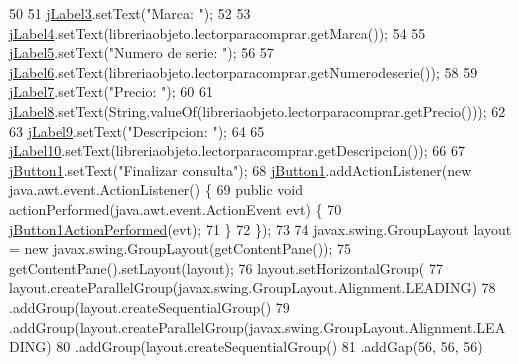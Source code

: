 \begin{DoxyCode}
50 
51         \mbox{\hyperlink{class_interfaz_package_1_1_consulta_lector_a105b198c795b5ad60698132d959db7c1}{jLabel3}}.setText(\textcolor{stringliteral}{"Marca: "});
52 
53         \mbox{\hyperlink{class_interfaz_package_1_1_consulta_lector_a17804aaae39ab2791472fa0422b576ff}{jLabel4}}.setText(libreriaobjeto.lectorparacomprar.getMarca());
54 
55         \mbox{\hyperlink{class_interfaz_package_1_1_consulta_lector_aae29076b214d7968c66c12c3cb9dcab2}{jLabel5}}.setText(\textcolor{stringliteral}{"Numero de serie: "});
56 
57         \mbox{\hyperlink{class_interfaz_package_1_1_consulta_lector_a1ae0bbc522d743dbe6a5df3d341f7b3b}{jLabel6}}.setText(libreriaobjeto.lectorparacomprar.getNumerodeserie());
58 
59         \mbox{\hyperlink{class_interfaz_package_1_1_consulta_lector_a0811e604bafe32c5d692a79c0f604233}{jLabel7}}.setText(\textcolor{stringliteral}{"Precio: "});
60 
61         \mbox{\hyperlink{class_interfaz_package_1_1_consulta_lector_a588cac9adcc7b646bf632082a010dde4}{jLabel8}}.setText(String.valueOf(libreriaobjeto.lectorparacomprar.getPrecio()));
62 
63         \mbox{\hyperlink{class_interfaz_package_1_1_consulta_lector_a96866944f1cce16d0348b78422bbb375}{jLabel9}}.setText(\textcolor{stringliteral}{"Descripcion: "});
64 
65         \mbox{\hyperlink{class_interfaz_package_1_1_consulta_lector_a4325d1c8a4fb7c899a653eaf0380ccad}{jLabel10}}.setText(libreriaobjeto.lectorparacomprar.getDescripcion());
66 
67         \mbox{\hyperlink{class_interfaz_package_1_1_consulta_lector_a89e1d76ca4c265da8a91df4b4a2a030d}{jButton1}}.setText(\textcolor{stringliteral}{"Finalizar consulta"});
68         \mbox{\hyperlink{class_interfaz_package_1_1_consulta_lector_a89e1d76ca4c265da8a91df4b4a2a030d}{jButton1}}.addActionListener(\textcolor{keyword}{new} java.awt.event.ActionListener() \{
69             \textcolor{keyword}{public} \textcolor{keywordtype}{void} actionPerformed(java.awt.event.ActionEvent evt) \{
70                 \mbox{\hyperlink{class_interfaz_package_1_1_consulta_lector_a61728802e88ad23c202f7ede6783b30c}{jButton1ActionPerformed}}(evt);
71             \}
72         \});
73 
74         javax.swing.GroupLayout layout = \textcolor{keyword}{new} javax.swing.GroupLayout(getContentPane());
75         getContentPane().setLayout(layout);
76         layout.setHorizontalGroup(
77             layout.createParallelGroup(javax.swing.GroupLayout.Alignment.LEADING)
78             .addGroup(layout.createSequentialGroup()
79                 .addGroup(layout.createParallelGroup(javax.swing.GroupLayout.Alignment.LEADING)
80                     .addGroup(layout.createSequentialGroup()
81                         .addGap(56, 56, 56)

\end{DoxyCode}
